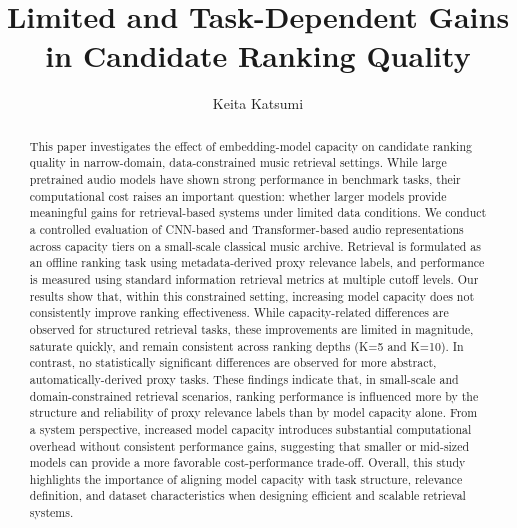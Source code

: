 \documentclass[sigconf]{acmart}
\begin{document}
\title[Revisiting Model Capacity in Data-Constrained Music Retrieval]{Limited and Task-Dependent Gains in Candidate Ranking Quality}

\author{Keita Katsumi}

\renewcommand{\shortauthors}{Katsumi}

\begin{abstract}
This paper investigates the effect of embedding-model capacity on candidate ranking quality in narrow-domain, data-constrained music retrieval settings. While large pretrained audio models have shown strong performance in benchmark tasks, their computational cost raises an important question: whether larger models provide meaningful gains for retrieval-based systems under limited data conditions. We conduct a controlled evaluation of CNN-based and Transformer-based audio representations across capacity tiers on a small-scale classical music archive. Retrieval is formulated as an offline ranking task using metadata-derived proxy relevance labels, and performance is measured using standard information retrieval metrics at multiple cutoff levels. Our results show that, within this constrained setting, increasing model capacity does not consistently improve ranking effectiveness. While capacity-related differences are observed for structured retrieval tasks, these improvements are limited in magnitude, saturate quickly, and remain consistent across ranking depths (K=5 and K=10). In contrast, no statistically significant differences are observed for more abstract, automatically-derived proxy tasks. These findings indicate that, in small-scale and domain-constrained retrieval scenarios, ranking performance is influenced more by the structure and reliability of proxy relevance labels than by model capacity alone. From a system perspective, increased model capacity introduces substantial computational overhead without consistent performance gains, suggesting that smaller or mid-sized models can provide a more favorable cost-performance trade-off. Overall, this study highlights the importance of aligning model capacity with task structure, relevance definition, and dataset characteristics when designing efficient and scalable retrieval systems.
\end{abstract}
\maketitle
\pagestyle{plain}
\end{document}
